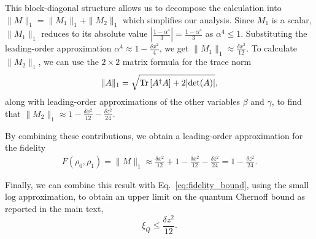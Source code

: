 \documentclass[reprint,amsmath,amssymb,aps,prl,floatfix,groupedaddress,superscriptaddress]{revtex4-2}
\begin{document}
This block-diagonal structure allows us to decompose the calculation into $\|M\|_1 = \|M_1\|_1 + \|M_2\|_1$ which simplifies our analysis.
Since $M_1$ is a scalar, $\|M_1\|_1$ reduces to its absolute value $|\frac{1-\alpha^4}{3}| = \frac{1-\alpha^4}{3}$ as $\alpha^4 \leq 1$. Substituting the leading-order approximation $\alpha^4 \approx 1 - \frac{\delta x^2}{4}$, we get $\|M_1\|_1 \approx \frac{\delta x^2}{12}$.
To calculate $\|M_2\|_1$, we can use the $2 \times 2$ matrix formula for the trace norm
\begin{equation}
\|A\|_1 = \sqrt{\text{Tr}\left[A^\dagger A \right] + 2 \abs{\operatorname{det}(A)}},
\end{equation}
along with leading-order approximations of the other variables $\beta$ and $\gamma$, to find that $\|M_2\|_1 \approx 1 - \frac{\delta x^2}{12} - \frac{\delta z^2}{24}$.

By combining these contributions, we obtain a leading-order approximation for the fidelity
\begin{equation}
\begin{aligned}
F(\rho_0,\rho_1) = \|M\|_1 \approx \frac{\delta x^2}{12} + 1 - \frac{\delta x^2}{12} - \frac{\delta z^2}{24} = 1 - \frac{\delta z^2}{24}.
\end{aligned}
\end{equation}

Finally, we can combine this result with Eq.~\eqref{eq:fidelity_bound}, using the small log approximation, to obtain an upper limit on the quantum Chernoff bound as reported in the main text,
\begin{equation}
    \xi_Q \leq \frac{\delta z^2}{12}.
\end{equation}
\end{document}

